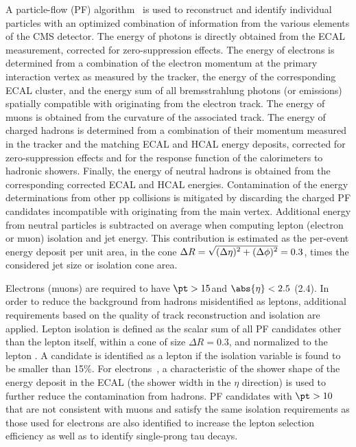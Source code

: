 A particle-flow (PF) algorithm~\cite{PF1,CMS-PAS-PFT-10-001} is used to reconstruct
and identify individual particles with an optimized combination of
information from the various elements of the CMS detector. The energy
of photons is directly obtained from the ECAL measurement, corrected
for zero-suppression effects. The energy of electrons is determined
from a combination of the electron momentum at the primary interaction
vertex as measured by the tracker, the energy of the corresponding
ECAL cluster, and the energy sum of all bremsstrahlung photons (or emissions)
spatially compatible with originating from the electron track. The
energy of muons is obtained from the curvature of the associated
track. The energy of charged hadrons is determined from a combination
of their momentum measured in the tracker and the matching ECAL and
HCAL energy deposits, corrected for zero-suppression effects and for
the response function of the calorimeters to hadronic
showers. Finally, the energy of neutral hadrons is obtained from the
corresponding corrected ECAL and HCAL energies. Contamination of the
energy determinations from other pp collisions is mitigated by
discarding the charged PF candidates incompatible with originating from the main vertex.  Additional
energy from neutral particles is subtracted on average when computing
lepton (electron or muon) isolation and jet energy. This contribution is estimated as the
per-event energy deposit per unit area, in the cone $\Delta R = \sqrt{\smash[b]{(\Delta
  \eta)^2+(\Delta\phi)^2}}=0.3$, times the considered jet size or
isolation cone area.

Electrons (muons) are required to have $\pt>15$\GeV and  $\abs{\eta}<2.5$
(2.4). In order to reduce the
background from hadrons misidentified as leptons, additional
requirements based on the
quality of track reconstruction and isolation are applied. Lepton isolation is
defined as the scalar \pt sum of all PF candidates other than the
lepton itself, within a cone of size $\Delta R = 0.3$, and normalized to the lepton \pt. A
candidate is identified as a lepton if the isolation variable is found to be smaller than 15\%.
For electrons~\cite{ElectronsCMS}, a characteristic of the shower
shape of the energy deposit in the ECAL (the shower width in the
$\eta$ direction) is used to further reduce the contamination from hadrons.
PF candidates with $\pt > 10$\GeV that are not consistent with muons and satisfy the same isolation
requirements as those used for electrons are also identified to increase the 
lepton selection efficiency as well as to identify single-prong tau decays. 


